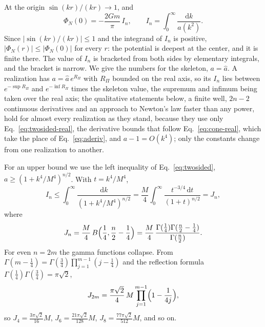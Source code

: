 \documentclass[a4paper,11pt]{article}
\newcommand{\dd}{\mathrm{d}}
\begin{document}
At the origin $\sin(kr)/(kr)\to1$, and
\begin{equation}
\label{eq:pot0}
\Phi_N(0)=-\frac{2Gm}{\pi}\,I_n,\qquad I_n=\int_0^\infty\frac{\dd k}{a(k^2)} .
\end{equation}
Since $|\sin(kr)/(kr)|\le1$ and the integrand of $I_n$ is positive, $|\Phi_N(r)|\le|\Phi_N(0)|$ for every $r$: the potential is deepest at the center, and it is finite there. The value of $I_n$ is bracketed from both sides by elementary integrals, and the bracket is narrow. We give the numbers for the skeleton, $a=\hat a$. A realization has $a=\hat a\,e^{R_\Pi}$ with $R_\Pi$ bounded on the real axis, so its $I_n$ lies between $e^{-\sup R_\Pi}$ and $e^{-\inf R_\Pi}$ times the skeleton value, the supremum and infimum being taken over the real axis; the qualitative statements below, a finite well, $2n-2$ continuous derivatives and an approach to Newton's law faster than any power, hold for almost every realization as they stand, because they use only Eq.~\eqref{eq:twosided-real}, the derivative bounds that follow Eq.~\eqref{eq:cone-real}, which take the place of Eq.~\eqref{eq:aderiv}, and $a-1=O(k^4)$; only the constants change from one realization to another.

For an upper bound we use the left inequality of Eq.~\eqref{eq:twosided}, $a\ge(1+k^4/M^4)^{n/2}$. With $t=k^4/M^4$,
\begin{equation}
\label{eq:Jn}
I_n\le\int_0^\infty\frac{\dd k}{(1+k^4/M^4)^{n/2}}=\frac M4\int_0^\infty\frac{t^{-3/4}\,\dd t}{(1+t)^{n/2}}=J_n,
\end{equation}
where
\begin{equation}
\label{eq:Jn-closed}
J_n=\frac M4\,B\Bigl(\frac14,\frac n2-\frac14\Bigr)=\frac M4\,\frac{\Gamma(\frac14)\Gamma(\frac n2-\frac14)}{\Gamma(\frac n2)} .
\end{equation}
For even $n=2m$ the gamma functions collapse. From $\Gamma(m-\frac14)=\Gamma(\frac34)\prod_{j=1}^{m-1}(j-\frac14)$ and the reflection formula $\Gamma(\frac14)\Gamma(\frac34)=\pi\sqrt2$,
\begin{equation}
\label{eq:Jeven}
J_{2m}=\frac{\pi\sqrt2}{4}\,M\prod_{j=1}^{m-1}\Bigl(1-\frac1{4j}\Bigr),
\end{equation}
so $J_4=\frac{3\pi\sqrt2}{16}M$, $J_6=\frac{21\pi\sqrt2}{128}M$, $J_8=\frac{77\pi\sqrt2}{512}M$, and so on.
\end{document}
